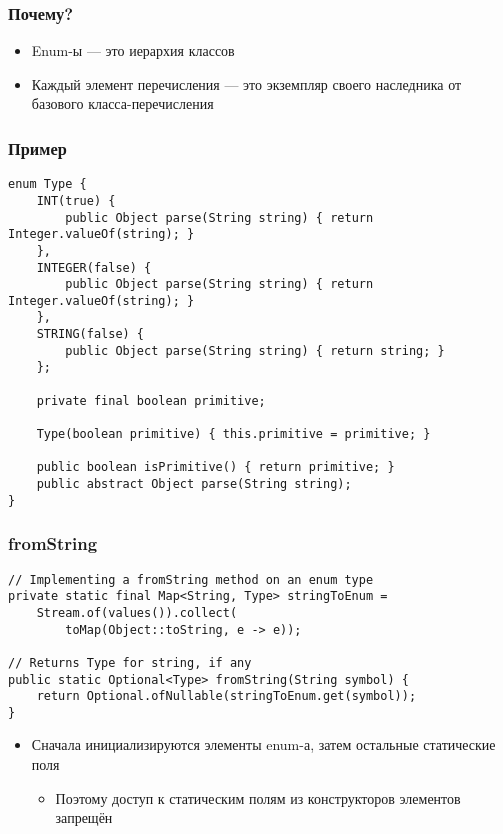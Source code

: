 \documentclass[xetex,mathserif,serif]{beamer}
\begin{document}
	\begin{frame}
		\frametitle{Почему?}
		\begin{itemize}
			\item Enum-ы --- это иерархия классов
			\item Каждый элемент перечисления --- это экземпляр своего наследника от базового класса-перечисления
		\end{itemize}
	\end{frame}

	\begin{frame}[fragile]
		\frametitle{Пример}
		\begin{footnotesize}
			\begin{verbatim}
enum Type {
    INT(true) {
        public Object parse(String string) { return Integer.valueOf(string); }  
    }, 
    INTEGER(false) {
        public Object parse(String string) { return Integer.valueOf(string); }  
    },
    STRING(false) {
        public Object parse(String string) { return string; }
    }; 
 
    private final boolean primitive;
     
    Type(boolean primitive) { this.primitive = primitive; } 
 
    public boolean isPrimitive() { return primitive; } 
    public abstract Object parse(String string); 
}
			\end{verbatim}
		\end{footnotesize}
	\end{frame}

	\begin{frame}[fragile]
		\frametitle{fromString}
		\begin{verbatim}
// Implementing a fromString method on an enum type
private static final Map<String, Type> stringToEnum =
    Stream.of(values()).collect(
        toMap(Object::toString, e -> e));

// Returns Type for string, if any
public static Optional<Type> fromString(String symbol) {
    return Optional.ofNullable(stringToEnum.get(symbol));
}
		\end{verbatim}
		\begin{itemize}
			\item Сначала инициализируются элементы enum-а, затем остальные статические поля
			\begin{itemize}
				\item Поэтому доступ к статическим полям из конструкторов элементов запрещён
			\end{itemize}
		\end{itemize}
	\end{frame}
\end{document}
